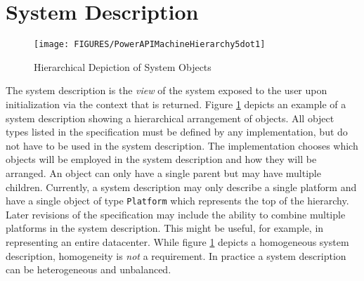 \documentclass[12pt]{report} %
\providecommand{\DIFaddbeginFL}{} %
\providecommand{\DIFaddendFL}{} %
\providecommand{\DIFdelbeginFL}{} %
\providecommand{\DIFdelendFL}{} %
\newcommand{\DIFscaledelfig}{0.5}
\newlength{\DIFdelgraphicswidth} %
\newlength{\DIFdelgraphicsheight} %
\newcommand{\DIFaddincludegraphics}[2][]{{\color{blue}\fbox{\DIFOincludegraphics[#1]{#2}}}} %
\newcommand{\DIFdelincludegraphics}[2][]{%
\sbox{\DIFdelgraphicsbox}{\DIFOincludegraphics[#1]{#2}}%
\settoboxwidth{\DIFdelgraphicswidth}{\DIFdelgraphicsbox} %
\settoboxtotalheight{\DIFdelgraphicsheight}{\DIFdelgraphicsbox} %
\scalebox{\DIFscaledelfig}{%
\parbox[b]{\DIFdelgraphicswidth}{\usebox{\DIFdelgraphicsbox}\\[-\baselineskip] \rule{\DIFdelgraphicswidth}{0em}}\llap{\resizebox{\DIFdelgraphicswidth}{\DIFdelgraphicsheight}{%
\setlength{\unitlength}{\DIFdelgraphicswidth}%
\begin{picture}(1,1)%
\thicklines\linethickness{2pt} %
{\color[rgb]{1,0,0}\put(0,0){\framebox(1,1){}}}%
{\color[rgb]{1,0,0}\put(0,0){\line( 1,1){1}}}%
{\color[rgb]{1,0,0}\put(0,1){\line(1,-1){1}}}%
\end{picture}%
}\hspace*{3pt}}} %
} %
\DeclareRobustCommand{\DIFaddbeginFL}{\DIFOaddbeginFL \let\includegraphics\DIFaddincludegraphics} %
\DeclareRobustCommand{\DIFaddendFL}{\DIFOaddendFL \let\includegraphics\DIFOincludegraphics} %
\DeclareRobustCommand{\DIFdelbeginFL}{\DIFOdelbeginFL \let\includegraphics\DIFdelincludegraphics} %
\DeclareRobustCommand{\DIFdelendFL}{\DIFOaddendFL \let\includegraphics\DIFOincludegraphics} %
\begin{document}
\section{System Description}\label{sec:PowerAPIBaseSysDesc}

\begin{figure}
	\begin{center}
		\DIFdelbeginFL %
\DIFdelendFL \DIFaddbeginFL \texttt{[image: FIGURES/PowerAPIMachineHierarchy5dot1]}
	\DIFaddendFL \end{center}
	\caption{Hierarchical Depiction of System Objects}
	\label{fig:BaseSystemMap}
\end{figure}

The system description is the \textit{view} of the system exposed to the user upon initialization via the context that is returned.
Figure \ref{fig:BaseSystemMap} depicts an example of a system description showing a hierarchical arrangement of objects.
All object types listed in the specification must be defined by any implementation, but do not have to be used in the system description.
The implementation chooses which objects will be employed in the system description and how they will be arranged.
An object can only have a single parent but may have multiple children.
Currently, a system description may only describe a single platform and have a single object of type \texttt{Platform} which represents the top of the hierarchy. 
Later revisions of the specification may include the ability to combine multiple platforms in the system description. 
This might be useful, for example, in representing an entire datacenter. 
While figure \ref{fig:BaseSystemMap} depicts a homogeneous system description, homogeneity is \textit{not} a requirement. 
In practice a system description can be heterogeneous and unbalanced.
\end{document}
